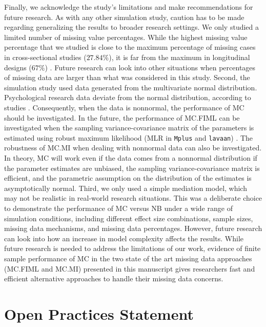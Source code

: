 \documentclass[man]{apa7}\usepackage[]{graphicx}\usepackage[]{xcolor}
\begin{document}
Finally,
we acknowledge the study's limitations and make recommendations for future research.
As with any other simulation study,
caution has to be made regarding generalizing the results to broader research settings.
We only studied a limited number of missing value percentages.
While the highest missing value percentage that we studied is close to the maximum percentage of missing cases
in cross-sectional studies ($27.84\%$),
it is far from the maximum in longitudinal designs ($67\%$)
\parencite[see][]{Lib-Missing-Data-Peugh-2004}.
Future research can look into other situations when percentages of missing data are larger than what was considered in this study.
Second,
the simulation study used data generated from the multivariate normal distribution.
Psychological research data deviate from the normal distribution,
according to studies
\parencite{Lib-Nonnormality-Micceri-1989,
Lib-Nonnormality-Blanca-2013}.
Consequently,
when the data is nonnormal,
the performance of MC should be investigated. 
In the future,
the performance of MC.FIML can be investigated when the sampling variance-covariance matrix of the parameters is estimated using robust maximum likelihood (MLR in \texttt{Mplus} and \texttt{lavaan})
\parencite[see][for SEM options for nonnormal data with missing cases]{Lib-Structural-Equation-Modeling-Nonnormality-and-Misspecification-Savalei-2021}.
The robustness of MC.MI when dealing with nonnormal data can also be investigated.
In theory,
MC will work even if the data comes from a nonnormal distribution if the parameter estimates are unbiased,
the sampling variance-covariance matrix is efficient,
and the parametric assumption on the distribution of the estimates is asymptotically normal.
Third,
we only used a simple mediation model,
which may not be realistic in real-world research situations.
This was a deliberate choice to demonstrate the performance of MC versus NB under a wide range of simulation conditions,
including different effect size combinations,
sample sizes,
missing data mechanisms,
and missing data percentages.
However,
future research can look into how an increase in model complexity affects the results.
While future research is needed to address the limitations of our work,
evidence of finite sample performance of MC in the two state of the art missing data approaches (MC.FIML and MC.MI)
presented in this manuscript gives researchers fast and efficient alternative approaches to handle their missing data concerns.

\section{Open Practices Statement}
\end{document}

